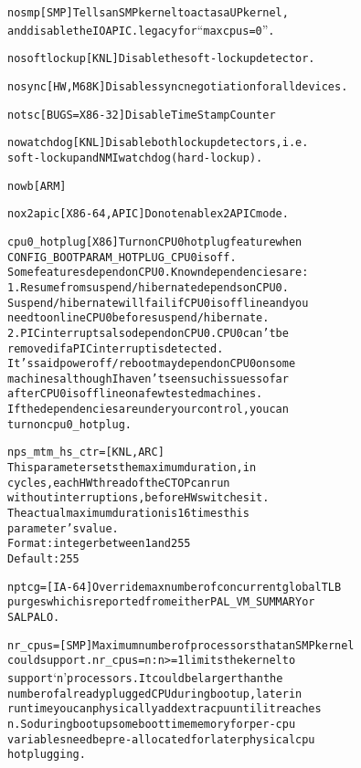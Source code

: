 \documentclass[a4paper,8pt,english]{sphinxmanual}
\begin{document}
\begin{alltt}
        nosmp           {[}SMP{]} Tells an SMP kernel to act as a UP kernel,
                        and disable the IO APIC.  legacy for ``maxcpus=0''.

        nosoftlockup    {[}KNL{]} Disable the soft-lockup detector.

        nosync          {[}HW,M68K{]} Disables sync negotiation for all devices.

        notsc           {[}BUGS=X86-32{]} Disable Time Stamp Counter

        nowatchdog      {[}KNL{]} Disable both lockup detectors, i.e.
                        soft-lockup and NMI watchdog (hard-lockup).

        nowb            {[}ARM{]}

        nox2apic        {[}X86-64,APIC{]} Do not enable x2APIC mode.

        cpu0\_hotplug    {[}X86{]} Turn on CPU0 hotplug feature when
                        CONFIG\_BOOTPARAM\_HOTPLUG\_CPU0 is off.
                        Some features depend on CPU0. Known dependencies are:
                        1. Resume from suspend/hibernate depends on CPU0.
                        Suspend/hibernate will fail if CPU0 is offline and you
                        need to online CPU0 before suspend/hibernate.
                        2. PIC interrupts also depend on CPU0. CPU0 can't be
                        removed if a PIC interrupt is detected.
                        It's said poweroff/reboot may depend on CPU0 on some
                        machines although I haven't seen such issues so far
                        after CPU0 is offline on a few tested machines.
                        If the dependencies are under your control, you can
                        turn on cpu0\_hotplug.

        nps\_mtm\_hs\_ctr= {[}KNL,ARC{]}
                        This parameter sets the maximum duration, in
                        cycles, each HW thread of the CTOP can run
                        without interruptions, before HW switches it.
                        The actual maximum duration is 16 times this
                        parameter's value.
                        Format: integer between 1 and 255
                        Default: 255

        nptcg=          {[}IA-64{]} Override max number of concurrent global TLB
                        purges which is reported from either PAL\_VM\_SUMMARY or
                        SAL PALO.

        nr\_cpus=        {[}SMP{]} Maximum number of processors that an SMP kernel
                        could support.  nr\_cpus=n : n \textgreater{}= 1 limits the kernel to
                        support `n' processors. It could be larger than the
                        number of already plugged CPU during bootup, later in
                        runtime you can physically add extra cpu until it reaches
                        n. So during boot up some boot time memory for per-cpu
                        variables need be pre-allocated for later physical cpu
                        hot plugging.


\end{alltt}
\end{document}
